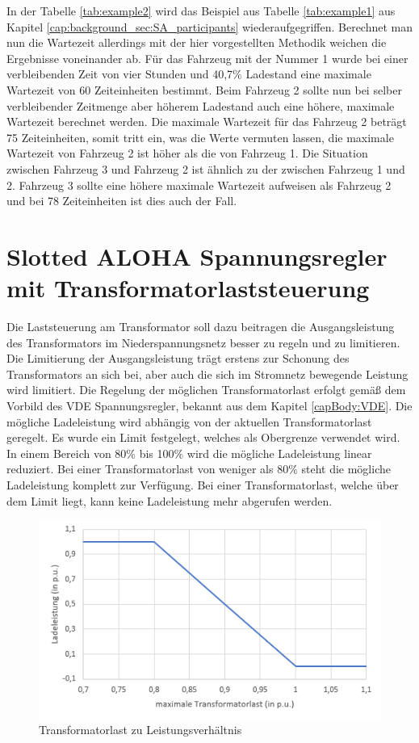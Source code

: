 In der Tabelle \ref{tab:example2} wird das Beispiel aus Tabelle \ref{tab:example1} aus Kapitel \ref{cap:background_sec:SA_participants} wiederaufgegriffen. Berechnet man nun die Wartezeit allerdings mit der hier vorgestellten Methodik weichen die Ergebnisse voneinander ab. Für das Fahrzeug mit der Nummer 1 wurde bei einer verbleibenden Zeit von vier Stunden und 40,7\% Ladestand eine maximale Wartezeit von 60 Zeiteinheiten bestimmt. Beim Fahrzeug 2 sollte nun bei selber verbleibender Zeitmenge aber höherem Ladestand auch eine höhere, maximale Wartezeit berechnet werden. Die maximale Wartezeit für das Fahrzeug 2 beträgt 75 Zeiteinheiten, somit tritt ein, was die Werte vermuten lassen, die maximale Wartezeit von Fahrzeug 2 ist höher als die von Fahrzeug 1. Die Situation zwischen Fahrzeug 3 und Fahrzeug 2 ist ähnlich zu der zwischen Fahrzeug 1 und 2. Fahrzeug 3 sollte eine höhere maximale Wartezeit aufweisen als Fahrzeug 2 und bei 78 Zeiteinheiten ist dies auch der Fall.  

\section{Slotted ALOHA Spannungsregler mit Transformatorlaststeuerung}
Die Laststeuerung am Transformator soll dazu beitragen die Ausgangsleistung des Transformators im Niederspannungsnetz besser zu regeln und zu limitieren. Die Limitierung der Ausgangsleistung trägt erstens zur Schonung des Transformators an sich bei, aber auch die sich im Stromnetz bewegende Leistung wird limitiert. Die Regelung der möglichen Transformatorlast erfolgt gemäß dem Vorbild des VDE Spannungsregler, bekannt aus dem Kapitel \ref{capBody:VDE}. Die mögliche Ladeleistung wird abhängig von der aktuellen Transformatorlast geregelt. Es wurde ein Limit festgelegt, welches als Obergrenze verwendet wird. In einem Bereich von 80\% bis 100\% wird die mögliche Ladeleistung linear reduziert. Bei einer Transformatorlast von weniger als 80\% steht die mögliche Ladeleistung komplett zur Verfügung. Bei einer Transformatorlast, welche über dem Limit liegt, kann keine Ladeleistung mehr abgerufen werden.  \\
\begin{figure}[htb]
	\includegraphics[width = \linewidth]{img/TrafoGraph1.png}
	\caption{Transformatorlast zu Leistungsverhältnis}
	\label{SATrafo:Graph}
\end{figure}

